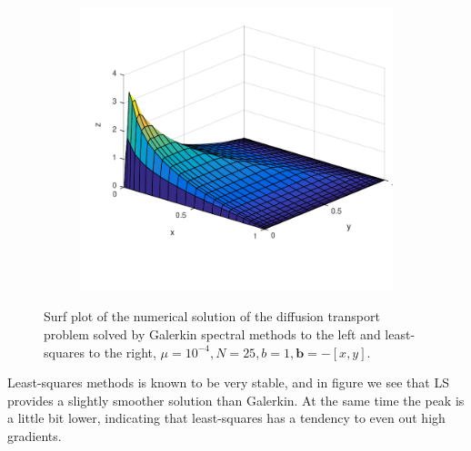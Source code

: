 \begin{figure}[h]
\begin{subfigure}[b]{0.48\textwidth}
	\includegraphics[width=\textwidth]{Figures/SpecLS_difftrans_aNeg.pdf}
  \end{subfigure}
  \vspace{-0.1\baselineskip}
	\caption{Surf plot of the numerical solution of the diffusion transport problem solved by Galerkin spectral methods to the left and least-squares to the right, $\mu = 10^{-4},N=25,b = 1, \mathbf{b} = -[x,y]$.}
  \label{fig:SurfDiffTransNeg}
\end{figure}
%
Least-squares methods is known to be very stable, and in figure we see that LS provides a slightly smoother solution than Galerkin. At the same time the peak is a little bit lower, indicating that least-squares has a tendency to even out high gradients.  
%
